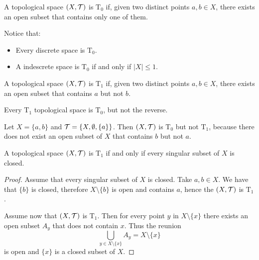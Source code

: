 \documentclass[../../main/main.tex]{subfiles}
\begin{document}
\begin{definition}
  A topological space $(X, \mathcal{T})$ is $\mathrm{T}_{0}$ if, given two distinct points $a, b \in X$, there exists an open subset that contains only one of them.
\end{definition}

 Notice that:
 \begin{itemize}
    \item Every discrete space is $\mathrm{T}_{0}$.
   \item A indescrete space is $\mathrm{T}_{0}$ if and only if $ | X | \leq 1$.
\end{itemize}

\begin{definition}
  A topological space $(X, \mathcal{T})$ is $\mathrm{T}_{1}$ if, given two distinct points $a, b \in X$, there exists an open subset that contains $a$ but not $b$.
\end{definition}

\begin{remark}
  Every $\mathrm{T}_{1}$ topological space is $\mathrm{T}_{0}$, but not the reverse.
\end{remark}

\begin{example}
  Let $X = \{a, b\}$ and $\mathcal{T} = \{X, \emptyset, \{a\}\}$. Then $(X, \mathcal{T})$ is $\mathrm{T}_{0}$ but not $\mathrm{T}_{1}$, because there does not exist an open subset of $X$ that contains $b$ but not $a$.
\end{example}

\begin{theorem}
  A topological space $(X, \mathcal{T})$ is $\mathrm{T}_{1}$ if and only if every singular subset of $X$ is closed.
\end{theorem}

\begin{proof}
  Assume that every singular subset of $X$ is closed. Take $a, b \in X$. We have that $\{b\}$ is closed, therefore $X \setminus \{b\}$ is open and contains $a$, hence the $(X, \mathcal{T})$ is $\mathrm{T}_{1}$.

  Assume now that $(X, \mathcal{T})$ is $\mathrm{T}_{1}$. Then for every point $y$ in $X \setminus \{x\}$ there exists an open subset $A_{y}$ that does not contain $x$. Thus the reunion
  \begin{equation*}
    \bigcup_{y \in X \setminus \{x\}} A_{y} = X \setminus \{x\}
  \end{equation*}
  is open and $\{x\}$ is a closed subset of $X$.
\end{proof}
\end{document}
